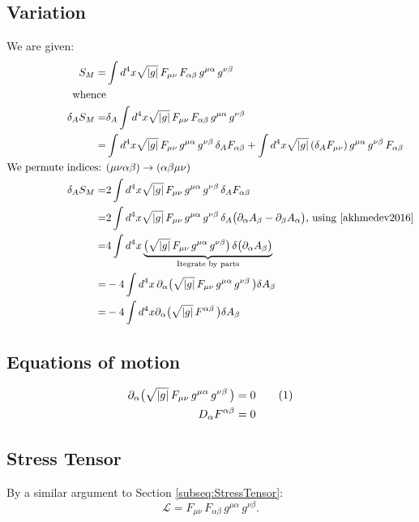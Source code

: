 \documentclass[]{article}
\newcommand{\Lagr}{\mathscr{L}}
\newcommand\numberthis{\addtocounter{equation}{1}\tag{\theequation}}
\begin{document}
\subsection{Variation}
We are given:
\begin{align*}
S_M =& \int d^4x \sqrt{|g|} \, F_{\mu\nu}\, F_{\alpha\beta} \, g^{\mu\alpha} \, g^{\nu\beta}\\
\text{whence}&\\
\delta_A S_M =& \delta_A \int d^4x \sqrt{|g|} \, F_{\mu\nu}\, F_{\alpha\beta} \, g^{\mu\alpha} \, g^{\nu\beta} \\
=&  \int d^4x \sqrt{|g|} \, F_{\mu\nu} \, g^{\mu\alpha} \, g^{\nu\beta} \, \delta_A F_{\alpha\beta} + \int d^4x \sqrt{|g|} \, (\delta_A F_{\mu\nu}) \, g^{\mu\alpha} \, g^{\nu\beta} \,  F_{\alpha\beta}\\
\text{We permute indices: }& (\mu\nu\alpha\beta)\rightarrow(\alpha\beta\mu\nu)\\
\delta_A S_M=& 2 \int d^4x \sqrt{|g|} \, F_{\mu\nu} \, g^{\mu\alpha} \, g^{\nu\beta} \, \delta_A F_{\alpha\beta} \\
=& 2 \int d^4x \sqrt{|g|} \, F_{\mu\nu} \, g^{\mu\alpha} \, g^{\nu\beta} \, \delta_A \big(\partial_\alpha A_\beta - \partial_\beta A_\alpha\big) \text{,  using \cite[(88)]{akhmedev2016}}\\
=& 4 \int d^4x \underbrace{\big(\sqrt{|g|} \, F_{\mu\nu} \, g^{\mu\alpha} \, g^{\nu\beta}\big) \, \delta \big(\partial_\alpha A_\beta \big)}_\text{Itegrate by parts}\\
=& -4 \int d^4x \, \partial_\alpha \big(\sqrt{|g|} \, F_{\mu\nu} \, g^{\mu\alpha} \, g^{\nu\beta} \,\big) \delta A_\beta\\
=& -4 \int d^4x \partial_\alpha \big(\sqrt{|g|} \, F^{\alpha\beta}  \,\big) \delta A_\beta
\end{align*}
\subsection{Equations of motion}
\begin{align*}
\partial_\alpha \big(\sqrt{|g|} \, F_{\mu\nu} \, g^{\mu\alpha} \, g^{\nu\beta} \,\big) &= 0 \numberthis \label{eq:eom} \\
 D_\alpha F^{\alpha\beta} &= 0
\end{align*}
\subsection{Stress Tensor}
By a similar argument to Section \ref{subseq:StressTensor}:
\begin{equation}
\Lagr= F_{\mu\nu}\, F_{\alpha\beta} \, g^{\mu\alpha} \, g^{\nu\beta}.
\label {eq:a}
\end{equation}
\end{document}
